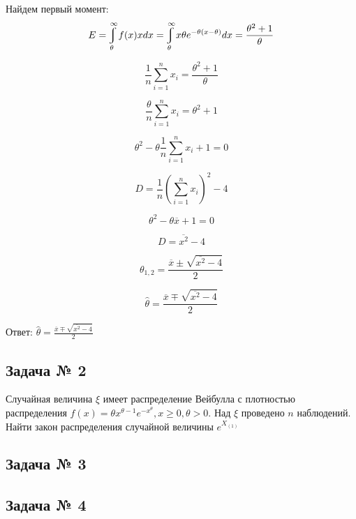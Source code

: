 \documentclass[a4paper,12pt, oneside]{book}
\let\int\varint
\begin{document}
Найдем первый момент:
$$
E = \int_{\theta}^{\infty} f(x) x dx = \int_{\theta}^{\infty} x \theta e^{-\theta(x-\theta)} dx = \frac{\theta^2 + 1}{\theta}
$$

$$
\frac{1}{n} \sum_{i=1}^{n} x_i =  \frac{\theta^2 + 1}{\theta}
$$

$$
\frac{\theta}{n} \sum_{i=1}^{n} x_i =  \theta^2 + 1
$$

$$
\theta^2 - \theta \frac{1}{n} \sum_{i=1}^{n} x_i +  1 = 0
$$

$$
D = \frac{1}{n} (\sum_{i=1}^{n} x_i)^2 - 4
$$

$$
\theta^2 - \theta \overline{x} + 1 = 0 
$$

$$
D = \overline{x^2} - 4
$$

$$
\theta_{1,2} = \frac{\overline{x} \pm \sqrt{\overline{x^2} -4}}{2}
$$

$$
\hat{\theta} = \frac{\overline{x} \mp \sqrt{\overline{x^2} - 4}}{2}
$$

Ответ: $ \hat{\theta} = \frac{\overline{x} \mp \sqrt{\overline{x^2} - 4}}{2}$


\begin{center}
	\chapter{Задача № 2}
\end{center}

Случайная величина $ \xi $ имеет распределение Вейбулла с плотностью распределения $f(x) = \theta x^{\theta - 1} e^{-x^{\theta}} , x \geq 0, \theta > 0.$ Над $ \xi $ проведено $ n $ наблюдений. Найти закон распределения случайной величины $ e^{X_{(1)}} $

\begin{center}
	\chapter{Задача № 3}
\end{center}

\begin{center}
	\chapter{Задача № 4}
\end{center}
\end{document}
